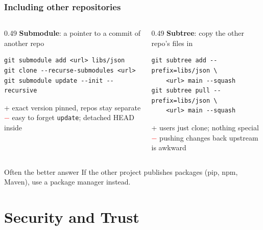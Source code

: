 \documentclass[aspectratio=169,10pt,compress]{beamer}
\begin{document}
\begin{frame}[t,fragile] \frametitle{Including other repositories}
  \begin{columns}[T]
    \begin{column}{0.49\textwidth}
      \textbf{Submodule}: a pointer to a commit of another repo
\begin{lstlisting}
git submodule add <url> libs/json
git clone --recurse-submodules <url>
git submodule update --init --recursive
\end{lstlisting}
      \small
      \textcolor{gitgreen}{+} exact version pinned, repos stay separate\\
      \textcolor{red}{$-$} easy to forget \texttt{update}; detached HEAD inside
    \end{column}
    \begin{column}{0.49\textwidth}
      \textbf{Subtree}: copy the other repo's files in
\begin{lstlisting}
git subtree add --prefix=libs/json \
    <url> main --squash
git subtree pull --prefix=libs/json \
    <url> main --squash
\end{lstlisting}
      \small
      \textcolor{gitgreen}{+} users just clone; nothing special\\
      \textcolor{red}{$-$} pushing changes back upstream is awkward
    \end{column}
  \end{columns}

  \vspace{0.5em}
  \begin{alertblock}{Often the better answer}
    If the other project publishes packages (pip, npm, Maven), use a package manager instead.
  \end{alertblock}
\end{frame}

\section[Security]{Security and Trust}
\end{document}
